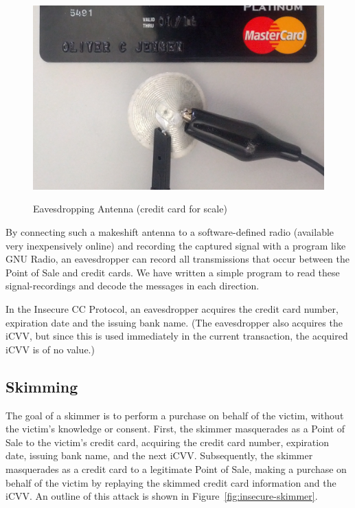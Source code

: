 \begin{figure}
  \caption{Eavesdropping Antenna (credit card for scale)}
  \centering
    \includegraphics[width=1.0\textwidth, clip=true, trim=0 0 0 0]{img/attack-3-eavesdrop-photo.png}
  \label{fig:insecure-eavesdropper-antenna}
\end{figure}

By connecting such a makeshift antenna to a software-defined radio (available very inexpensively online) and recording the captured signal with a program like GNU Radio, an eavesdropper can record all transmissions that occur between the Point of Sale and credit cards.
We have written a simple program to read these signal-recordings and decode the messages in each direction.

In the Insecure CC Protocol, an eavesdropper acquires the credit card number, expiration date and the issuing bank name.
(The eavesdropper also acquires the iCVV, but since this is used immediately in the current transaction, the acquired iCVV is of no value.)





\subsection{Skimming}
\label{sec:insecure-skimmer}
The goal of a skimmer is to perform a purchase on behalf of the victim, without the victim's knowledge or consent.
First, the skimmer masquerades as a Point of Sale to the victim's credit card, acquiring the credit card number, expiration date, issuing bank name, and the next iCVV.
Subsequently, the skimmer masquerades as a credit card to a legitimate Point of Sale, making a purchase on behalf of the victim by replaying the skimmed credit card information and the iCVV.
An outline of this attack is shown in Figure~\ref{fig:insecure-skimmer}.

